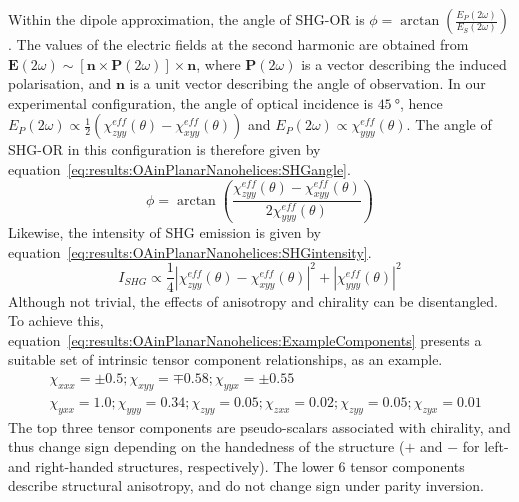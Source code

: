 Within the dipole approximation, the angle of SHG-OR is $\phi=\arctan{\left(\frac{E_P\left(2\omega\right)}{E_S\left(2\omega\right)}\right)}$. 
The values of the electric fields at the second harmonic are obtained from $\mathbf{E}(2\omega)\sim[\mathbf{n}\times\mathbf{P}(2\omega)]\times\mathbf{n}$, where $\mathbf{P}(2\omega)$ is a vector describing the induced polarisation, and $\mathbf{n}$ is a unit vector describing the angle of observation. 
In our experimental configuration, the angle of optical incidence is $\SI{45}{\degree}$, hence $E_P(2\omega)\propto\frac{1}{2}(\chi_{zyy}^{eff}(\theta)-\chi_{xyy}^{eff}(\theta))$ and $E_P(2\omega)\propto\chi_{yyy}^{eff}(\theta)$. 
The angle of SHG-OR in this configuration is therefore given by equation~\ref{eq:results:OAinPlanarNanohelices:SHGangle}.
\begin{equation}\label{eq:results:OAinPlanarNanohelices:SHGangle}
	\phi  = \arctan \left({\frac{\chi_{zyy}^{eff}(\theta) - \chi _{xyy}^{eff}(\theta)}{2\chi _{yyy}^{eff}(\theta)}}\right)
\end{equation}
Likewise, the intensity of SHG emission is given by equation~\ref{eq:results:OAinPlanarNanohelices:SHGintensity}.
\begin{equation}\label{eq:results:OAinPlanarNanohelices:SHGintensity}
	I_{SHG} \propto \frac{1}{4}{\left| {\chi _{zyy}^{eff}\left( \theta  \right) - \chi _{xyy}^{eff}\left( \theta  \right)} \right|^2} + {\left| {\chi _{yyy}^{eff}\left( \theta  \right)} \right|^2}
\end{equation}
Although not trivial, the effects of anisotropy and chirality can be disentangled. To achieve this, equation~\ref{eq:results:OAinPlanarNanohelices:ExampleComponents} presents a suitable set of intrinsic tensor component relationships, as an example.
\begin{equation}\label{eq:results:OAinPlanarNanohelices:ExampleComponents}
	\begin{split}
		& \chi_{xxx} = \pm 0.5; \chi_{xyy} = \mp0.58; \chi_{yyx} = \pm 0.55 \\
		& \chi _{yxx} = 1.0; \chi _{yyy} = 0.34; \chi _{zyy} = 0.05; \chi _{zxx} = 0.02; \chi_{zyy} = 0.05; \chi _{zyx} = 0.01
	\end{split}
\end{equation}
The top three tensor components are pseudo-scalars associated with chirality, and thus change sign depending on the handedness of the structure ($+$ and $-$ for left- and right-handed structures, respectively). 
The lower 6 tensor components describe structural anisotropy, and do not change sign under parity inversion. 

